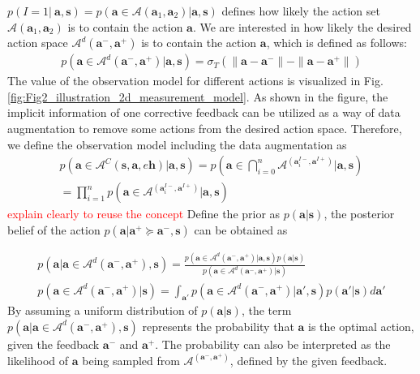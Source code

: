 $p (I = 1 | \ \bm a, \bm s) = p(\bm a \in \mathcal{A}{(\bm a_1, \bm a_2)} |
 \bm a, \bm s) $  defines 
 how likely the action set $\mathcal{A}{(\bm a_1, \bm a_2)}$ is to contain the action $\bm a$.
 We are interested in how likely the desired action space $\mathcal{A}^d{(\bm a^-, \bm a^+)}$ is to contain the action $\bm a$, which is defined as follows:
\begin{align*}
    p (\bm a \in \mathcal{A}^d{(\bm a^-, \bm a^+)} | \bm a , \bm s) =   \sigma_T(\| \bm a- \bm a^-\| - \| \bm a- \bm a^+\|) 
\end{align*}
The value of the observation model for different actions is visualized in Fig. \ref{fig:Fig2_illustration_2d_measurement_model}. As shown in the figure, the implicit information of one corrective feedback can be utilized as a way of data augmentation to remove some actions from the desired action space. 
Therefore, we define the observation model including the data augmentation as
\begin{align*}
   p ( \bm a \in \mathcal{A}^{C} (\bm s, \bm a, e\bm h) |  \bm a, \bm s) = 
    p \left(\bm a \in \bigcap_{i=0}^n \mathcal{A}^{ (\bm a^{I-}_i, \bm a^{I+})} | \bm a , \bm s \right)
    \\
    = \prod_{i=1}^n p (\bm a \in \mathcal{A}^{ (\bm a^{I-}_i, \bm a^{I+})}| \bm a , \bm s) 
\end{align*}
\textcolor{red}{explain clearly to reuse the concept}
Define the prior as $p(\bm a | \bm s)$,
the posterior belief of the action $ p (  \bm a |\bm a^+ \succeq \bm a^-,  \bm s)$ can be obtained as 


\begin{align}
p ( \bm a |  \bm a \in \mathcal{A}^d{(\bm a^-, \bm a^+)},  \bm s) =\frac{ p (\bm a \in \mathcal{A}^d{(\bm a^-, \bm a^+)} | \bm a , \bm s) p(\bm a | \bm s)}{p (\bm a \in \mathcal{A}^d{(\bm a^-, \bm a^+)} | \bm s)} \\
    p (\bm a \in \mathcal{A}^d{(\bm a^-, \bm a^+)} | \bm s) = \int_{\bm a'} p (\bm a \in \mathcal{A}^d{(\bm a^-, \bm a^+)} | \bm a' , \bm s) p(\bm a'  | \bm s) d \bm a'
\end{align}
By assuming a uniform distribution of $p(\bm a | \bm s)$, the term $p ( \bm a |  \bm a \in \mathcal{A}^d{(\bm a^-, \bm a^+)},  \bm s)$ represents the probability that $\bm a$ is the optimal action, given the feedback $\bm a^-$ and $\bm a^+$.
The probability can also be interpreted as the likelihood of $\bm a$ being sampled from $\mathcal{A}^{(\bm a^-, \bm a^+)}$, defined by the given feedback.

